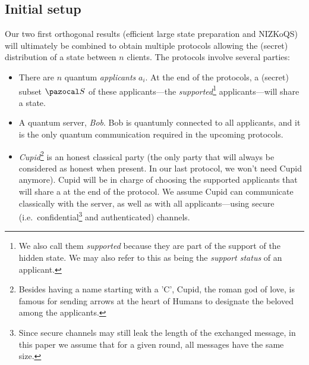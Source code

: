 \subsection{Initial setup}\label{subsec:initialSetup}
Our two first orthogonal results (efficient large state preparation and NIZKoQS) will ultimately be combined to obtain multiple protocols allowing the (secret) distribution of a \GHZ{} state between $n$ clients. The protocols involve several parties:
\begin{itemize}
  \item There are $n$ quantum \emph{applicants} $a_i$. At the end of the protocols, a (secret) subset $\cS$ of these applicants---the \emph{supported}\footnote{We also call them \emph{supported} because they are part of the support of the hidden \GHZ{} state. We may also refer to this as being the \emph{support status} of an applicant.} applicants---will share a \GHZ{} state.
  \item A quantum server, \emph{Bob}. Bob is quantumly connected to all applicants, and it is the only quantum communication required in the upcoming protocols.
  \item \emph{Cupid}\footnote{Besides having a name starting with a 'C', Cupid, the roman god of love, is famous for sending arrows at the heart of Humans to designate the beloved among the applicants.} is an honest classical party (the only party that will always be considered as honest when present. In our last protocol, we won't need Cupid anymore). Cupid will be in charge of choosing the supported applicants that will share a \GHZ{} at the end of the protocol. We assume Cupid can communicate classically with the server, as well as with all applicants---using secure (i.e.\ confidential\footnote{Since secure channels may still leak the length of the exchanged message, in this paper we assume that for a given round, all messages have the same size.} and authenticated) channels.\\

\end{itemize}
